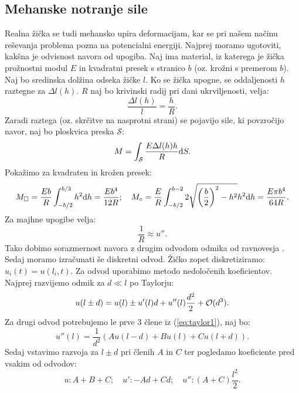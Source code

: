 \documentclass{article}
\begin{document}
\subsection{Mehanske notranje sile}
Realna žička se tudi mehansko upira deformacijam, kar se pri našem načinu reševanja problema pozna na potencialni energiji. Najprej moramo ugotoviti, kakšna je odvisnost navora od upogiba. Naj ima material, iz katerega je žička prožnostni modul $E$ in kvadratni presek s stranico $b$ (oz. krožni s premerom $b$). Naj bo sredinska dolžina odseka žičke $l$. Ko se žička upogne, se oddaljenosti $h$ raztegne za $\Delta l(h)$. $R$ naj bo krivinski radij pri dani ukrviljenosti, velja:
\begin{equation}
    \frac{\Delta l(h)}{l}=\frac{h}{R}.
\end{equation}
Zaradi raztega (oz. skrčitve na nasprotni strani) se pojavijo sile, ki povzročijo navor, naj bo ploskvica preska $\mathcal{S}$:
\begin{equation}
    M=\int_\mathcal{S}\frac{E\Delta l(h)h}{R}\mathrm{d} S.
\end{equation}
Pokažimo za kvadraten in krožen presek:
\begin{equation}
    M_\square=\frac{Eb}{R}\int_{-b/2}^{b/3}h^2\mathrm{d} h=\frac{Eb^4}{12R};\quad M_\circ=\frac{E}{R}\int_{-b/2}^{b-2}2\sqrt{\left(\frac{b}{2}\right)^2-h^2}h^2\mathrm{d} h=\frac{E\pi b^4}{64R}.
\end{equation}
Za majhne upogibe velja:
\begin{equation}
    \frac{1}{R}\approx u''.
\end{equation}
Tako dobimo sorazmernost navora z drugim odvodom odmika od ravnovesja \cite{Kuščer_Kodre_Neunzert_Razpet_2016}. Sedaj moramo izračunati še diskretni odvod. Žičko zopet diskretiziramo: $u_i(t)=u(l_i,t)$. Za odvod uporabimo metodo nedoločenih koeficientov. Najprej razvijemo odmik za $d\ll l$ po Taylorju:
\begin{equation}
    u(l\pm d)=u(l)\pm u'(l)d+u''(l)\frac{d^2}{2}+\operatorname{\mathcal{O}}(d^3).
    \label{eq:taylor1}
\end{equation}
Za drugi odvod potrebujemo le prve 3 člene iz (\ref{eq:taylor1}), naj bo:
\begin{equation}
    u''(l)=\frac{1}{d^2}(Au(l-d)+Bu(l)+Cu(l+d)).
\end{equation}
Sedaj vstavimo razvoja za $l\pm d$ pri členih $A$ in $C$ ter pogledamo koeficiente pred vsakim od odvodov:
\begin{equation}
    u: A+B+C;\quad u': -Ad+Cd;\quad u'':(A+C)\frac{l^2}{2}.
\end{equation}
\end{document}
